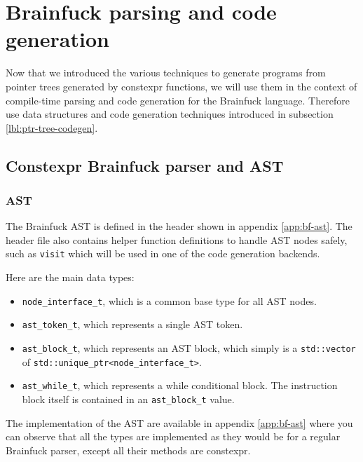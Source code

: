 \documentclass[../main]{subfiles}
\begin{document}
\section{
  Brainfuck parsing and code generation
}

Now that we introduced the various techniques to generate programs from
pointer trees generated by \gls{constexpr} functions, we will use them in the
context of compile-time parsing and code generation for the Brainfuck language.
Therefore use data structures and code generation techniques introduced in
subsection \ref{lbl:ptr-tree-codegen}.

\subsection{
  Constexpr Brainfuck parser and AST
}

\subsubsection{
  AST
}

The Brainfuck AST is defined in the header shown in appendix \ref{app:bf-ast}.
The header file also contains helper function definitions to handle AST nodes
safely, such as \lstinline{visit} which will be used in one of the
code generation backends.

Here are the main data types:

\begin{itemize}
\item
\lstinline{node_interface_t}, which is a common base type for all AST nodes.

\item
\lstinline{ast_token_t}, which represents a single AST token.

\item
\lstinline{ast_block_t}, which represents an AST block, which simply is a
\lstinline{std::vector} of \lstinline{std::unique_ptr<node_interface_t>}.

\item
\lstinline{ast_while_t}, which represents a while conditional block.
The instruction block itself is contained in an \lstinline{ast_block_t} value.

\end{itemize}

The implementation of the AST are available in appendix \ref{app:bf-ast}
where you can observe that all the types are implemented as they would be
for a regular Brainfuck parser, except all their methods are \gls{constexpr}.
\end{document}
